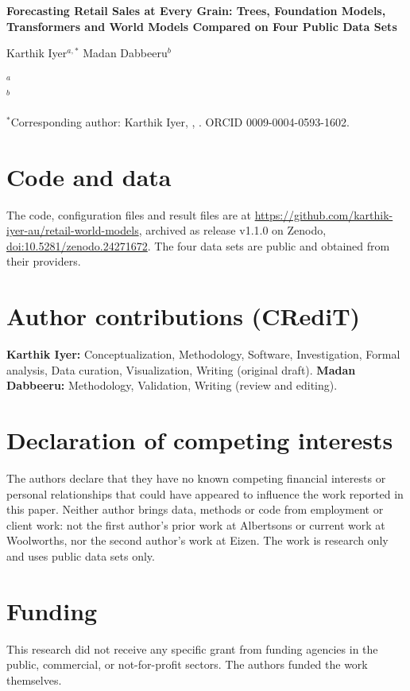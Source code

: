 \documentclass[11pt]{article}
\begin{document}
\begin{center}
{\Large\bfseries Forecasting Retail Sales at Every Grain: Trees, Foundation Models,
Transformers and World Models Compared on Four Public Data Sets\par}
\vspace{12pt}
Karthik Iyer$^{a,*}$ \quad Madan Dabbeeru$^{b}$\par
\vspace{6pt}
{\small $^{a}$ \affilA\\
$^{b}$ \affilB\par}
\end{center}

\noindent $^{*}$Corresponding author: Karthik Iyer,
\href{mailto:\corrEmail}{\corrEmail}, \corrAddress. ORCID 0009-0004-0593-1602.

\section*{Code and data}
The code, configuration files and result files are at
\url{https://github.com/karthik-iyer-au/retail-world-models}, archived as release v1.1.0 on Zenodo,
\href{https://doi.org/10.5281/zenodo.24271672}{doi:10.5281/zenodo.24271672}. The four data sets are public
and obtained from their providers.

\section*{Author contributions (CRediT)}
\textbf{Karthik Iyer:} Conceptualization, Methodology, Software, Investigation, Formal analysis, Data curation,
Visualization, Writing (original draft). \textbf{Madan Dabbeeru:} Methodology, Validation,
Writing (review and editing).

\section*{Declaration of competing interests}
The authors declare that they have no known competing financial interests or personal relationships that could
have appeared to influence the work reported in this paper. Neither author brings data, methods or code from
employment or client work: not the first author's prior work at Albertsons or current work at Woolworths, nor the
second author's work at Eizen. The work is research only and uses public data sets only.

\section*{Funding}
This research did not receive any specific grant from funding agencies in the public, commercial, or
not-for-profit sectors. The authors funded the work themselves.
\end{document}
